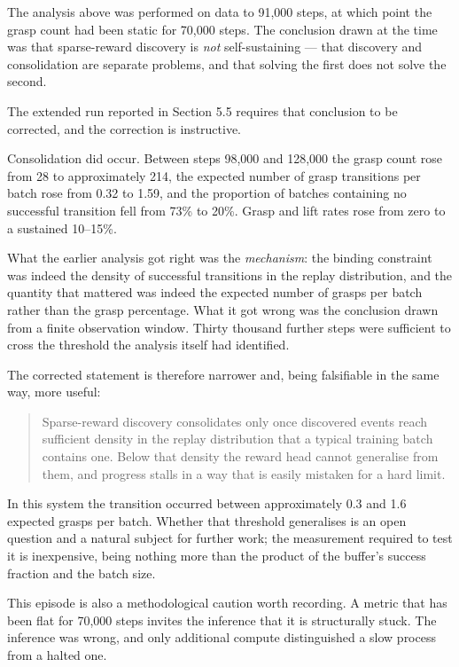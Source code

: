 \documentclass[12pt,a4paper,oneside]{report}
\begin{document}
The analysis above was performed on data to 91,000 steps, at which point the
grasp count had been static for 70,000 steps. The conclusion drawn at the time
was that sparse-reward discovery is \emph{not} self-sustaining --- that discovery and
consolidation are separate problems, and that solving the first does not solve
the second.

The extended run reported in Section 5.5 requires that conclusion to be
corrected, and the correction is instructive.

Consolidation did occur. Between steps 98,000 and 128,000 the grasp count rose
from 28 to approximately 214, the expected number of grasp transitions per batch
rose from 0.32 to 1.59, and the proportion of batches containing no successful
transition fell from 73\% to 20\%. Grasp and lift rates rose from zero to a
sustained 10--15\%.

What the earlier analysis got right was the \emph{mechanism}: the binding constraint
was indeed the density of successful transitions in the replay distribution, and
the quantity that mattered was indeed the expected number of grasps per batch
rather than the grasp percentage. What it got wrong was the conclusion drawn
from a finite observation window. Thirty thousand further steps were sufficient
to cross the threshold the analysis itself had identified.

The corrected statement is therefore narrower and, being falsifiable in the same
way, more useful:

\begin{quote}
Sparse-reward discovery consolidates only once discovered events reach
sufficient density in the replay distribution that a typical training batch
contains one. Below that density the reward head cannot generalise from them,
and progress stalls in a way that is easily mistaken for a hard limit.
\end{quote}

In this system the transition occurred between approximately 0.3 and 1.6
expected grasps per batch. Whether that threshold generalises is an open
question and a natural subject for further work; the measurement required to
test it is inexpensive, being nothing more than the product of the buffer's
success fraction and the batch size.

This episode is also a methodological caution worth recording. A metric that has
been flat for 70,000 steps invites the inference that it is structurally stuck.
The inference was wrong, and only additional compute distinguished a slow
process from a halted one.
\end{document}
